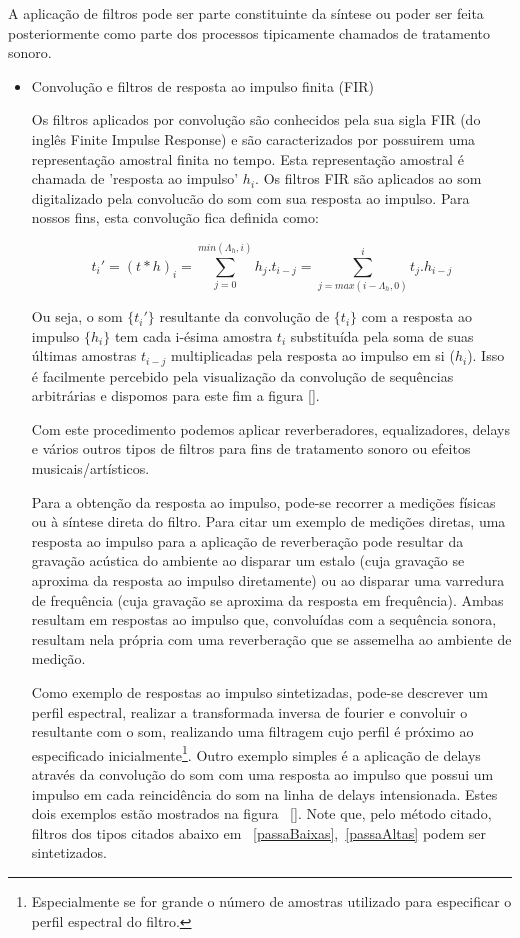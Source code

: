 A aplicação de filtros pode
ser parte constituinte da síntese ou poder ser feita posteriormente
como parte dos processos tipicamente chamados de tratamento sonoro.


\begin{itemize}

\item  Convolução e filtros de resposta ao impulso finita (FIR)

Os filtros aplicados por convolução são conhecidos
pela sua sigla FIR (do inglês Finite Impulse Response)
e são caracterizados por possuirem uma representação amostral
finita no tempo. Esta representação amostral é chamada
de 'resposta ao impulso' $h_i$. Os filtros FIR são aplicados ao som
digitalizado pela convolucão do som com sua 
resposta ao impulso. Para nossos fins, esta
convolução fica definida como:

\begin{equation}
t_i'=(t*h)_i=\sum_{j=0}^{min(\Lambda_h,i)}h_{j} . t_{i-j}=\sum_{j=max(i-\Lambda_h,0)}^{i}t_j . h_{i-j}
\end{equation}

Ou seja, o som $\{t_i'\}$ resultante da convolução de $\{t_i\}$ com a resposta ao impulso $\{h_i\}$
tem cada i-ésima amostra $t_i$ substituída pela soma de suas últimas amostras $t_{i-j}$
multiplicadas pela resposta ao impulso em si ($h_i$). Isso é facilmente
percebido pela visualização da convolução de sequências arbitrárias e dispomos
para este fim a figura \ref{}.

Com este procedimento podemos aplicar reverberadores, equalizadores, delays
e vários outros tipos de filtros para fins de tratamento sonoro ou
efeitos musicais/artísticos.
 
Para a obtenção da resposta ao impulso, pode-se recorrer a medições
físicas ou à síntese direta do filtro. Para citar um exemplo
de medições diretas, uma resposta ao impulso para a aplicação
de reverberação pode resultar da gravação acústica do ambiente ao disparar
um estalo (cuja gravação se aproxima da resposta ao impulso diretamente) ou ao disparar uma
varredura de frequência (cuja gravação se aproxima da resposta em frequência).
Ambas resultam em respostas ao impulso
que, convoluídas com a sequência sonora, resultam nela própria
com uma reverberação que se assemelha ao ambiente de medição.

Como exemplo de respostas ao impulso sintetizadas, pode-se
descrever um perfil espectral, realizar a transformada inversa
de fourier e convoluir o resultante com o som, realizando
uma filtragem cujo perfil é próximo ao especificado inicialmente\footnote{Especialmente
se for grande o número de amostras utilizado para especificar o perfil espectral
do filtro.}. Outro exemplo simples é a aplicação de delays através
da convolução do som com uma resposta ao impulso que possui um impulso
em cada reincidência do som na linha de delays intensionada. Estes dois exemplos
estão mostrados na figura ~\ref{}. Note que, pelo método citado,
filtros dos tipos citados abaixo em ~\ref{passaBaixas},~\ref{passaAltas} podem ser sintetizados.



\end{itemize}
